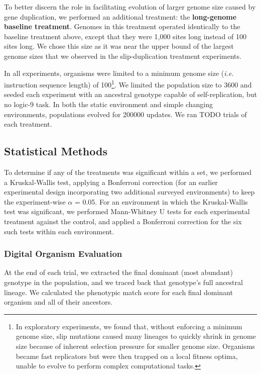 To better discern the role in facilitating evolution of larger genome size caused by gene duplication, we performed an additional treatment: the \textbf{long-genome baseline treatment}.
Genomes in this treatment operated identically to the baseline treatment above, except that they were 1,000 sites long instead of 100 sites long.
We chose this size as it was near the upper bound of the largest genome sizes that we observed in the slip-duplication treatment experiments.

In all experiments, organisms were limited to a minimum genome size (\textit{i.e.} instruction sequence length) of 100\footnote{
In exploratory experiments, we found that, without enforcing a minimum genome size, slip mutations caused many lineages to quickly shrink in genome size because of inherent selection pressure for smaller genome size. Organisms became fast replicators but were then trapped on a local fitness optima, unable to evolve to perform complex computational tasks.
}.
We limited the population size to 3600 and seeded each experiment with an ancestral genotype capable of self-replication, but no logic-9 task.
In both the static environment and simple changing environments, populations evolved for 200000 updates.
We ran TODO trials of each treatment.

\subsection{Statistical Methods}

To determine if any of the treatments was significant within a set, we performed a Kruskal-Wallis test, applying a Bonferroni correction (for an earlier experimental design incorporating two additional surveyed environments) to keep the experiment-wise $\alpha$ = 0.05.
For an environment in which the Kruskal-Wallis test was significant, we performed Mann-Whitney U tests for each experimental treatment against the control, and applied a Bonferroni correction for the six such tests within each environment.

\subsubsection{Digital Organism Evaluation}
At the end of each trial, we extracted the final dominant (most abundant) genotype in the population, and we traced back that genotype's full ancestral lineage.
We calculated the phenotypic match score for each final dominant organism and all of their ancestors.

